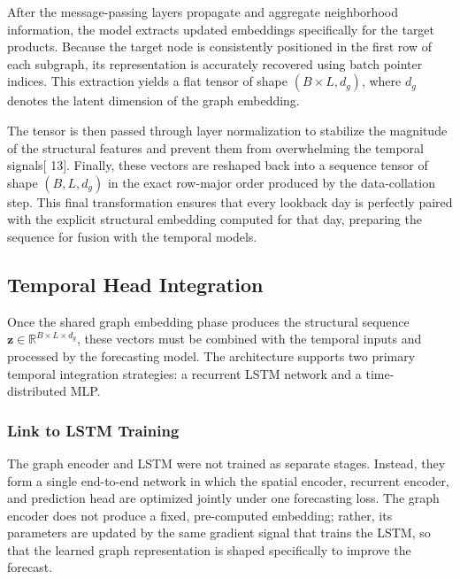 After the message-passing layers propagate and aggregate neighborhood information, the model extracts updated embeddings specifically for the target products. Because the target node is consistently positioned in the first row of each subgraph, its representation is accurately recovered using batch pointer indices. This extraction yields a flat tensor of shape $(B \times L, d_g)$, where $d_g$ denotes the latent dimension of the graph embedding. 

The tensor is then passed through layer normalization to stabilize the magnitude of the structural features and prevent them from overwhelming the temporal signals[ 13]. Finally, these vectors are reshaped back into a sequence tensor of shape $(B, L, d_g)$ in the exact row-major order produced by the data-collation step. This final transformation ensures that every lookback day is perfectly paired with the explicit structural embedding computed for that day, preparing the sequence for fusion with the temporal models.

\subsection{Temporal Head Integration}

Once the shared graph embedding phase produces the structural sequence $\mathbf{z} \in \mathbb{R}^{B \times L \times d_g}$, these vectors must be combined with the temporal inputs and processed by the forecasting model. The architecture supports two primary temporal integration strategies: a recurrent LSTM network and a time-distributed MLP.

\subsubsection{Link to LSTM Training}

The graph encoder and LSTM were not trained as separate stages. Instead, they form a single end-to-end network in which the spatial encoder, recurrent encoder, and prediction head are optimized jointly under one forecasting loss. The graph encoder does not produce a fixed, pre-computed embedding; rather, its parameters are updated by the same gradient signal that trains the LSTM, so that the learned graph representation is shaped specifically to improve the forecast.

